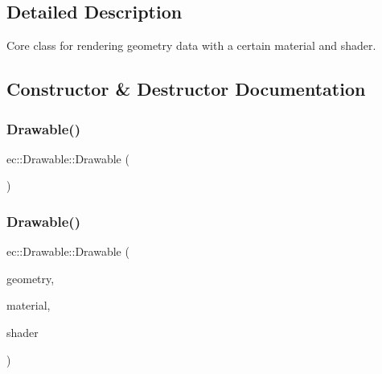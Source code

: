 \subsection{Detailed Description}
Core class for rendering geometry data with a certain material and shader. 

\subsection{Constructor \& Destructor Documentation}
\mbox{\label{classec_1_1_drawable_adb3c4e7b4d3d510489a26b3d1a8094a2}} 
\subsubsection{\texorpdfstring{Drawable()}{Drawable()}\hspace{0.1cm}{\footnotesize\ttfamily [1/2]}}
{\footnotesize\ttfamily ec\+::\+Drawable\+::\+Drawable (\begin{DoxyParamCaption}{ }\end{DoxyParamCaption})\hspace{0.3cm}{\ttfamily [explicit]}}

\mbox{\label{classec_1_1_drawable_a1a6fee8a6543e001ee2943bda72e17cd}} 
\subsubsection{\texorpdfstring{Drawable()}{Drawable()}\hspace{0.1cm}{\footnotesize\ttfamily [2/2]}}
{\footnotesize\ttfamily ec\+::\+Drawable\+::\+Drawable (\begin{DoxyParamCaption}\item[{\mbox{\hyperlink{classec_1_1_i_geometry_access}{I\+Geometry\+Access}} $\ast$}]{geometry,  }\item[{\mbox{\hyperlink{classec_1_1_material}{Material}} $\ast$}]{material,  }\item[{\mbox{\hyperlink{classec_1_1_shader}{Shader}} $\ast$}]{shader }\end{DoxyParamCaption})\hspace{0.3cm}{\ttfamily [explicit]}}



